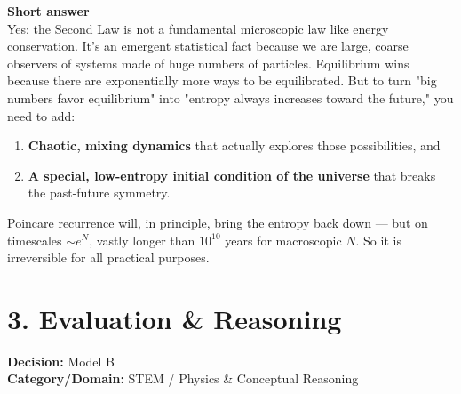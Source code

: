 \documentclass[11pt, a4paper]{article}
\begin{document}
{{        \vspace{0.2cm}
        \textbf{Short answer}\\
        Yes: the Second Law is not a fundamental microscopic law like energy conservation. It's an emergent statistical fact because we are large, coarse observers of systems made of huge numbers of particles. Equilibrium wins because there are exponentially more ways to be equilibrated. But to turn "big numbers favor equilibrium" into "entropy always increases toward the future," you need to add:
        \begin{enumerate}[leftmargin=*, topsep=0pt]
            \item \textbf{Chaotic, mixing dynamics} that actually explores those possibilities, and
            \item \textbf{A special, low-entropy initial condition of the universe} that breaks the past-future symmetry.
        \end{enumerate}
        Poincare recurrence will, in principle, bring the entropy back down --- but on timescales $\sim e^N$, vastly longer than $10^{10}$ years for macroscopic $N$. So it is irreversible for all practical purposes.
    }%
}

\vspace{0.5cm}

\section*{3. Evaluation \& Reasoning}

\textbf{Decision:} Model B \\
\textbf{Category/Domain:} STEM / Physics \& Conceptual Reasoning
\end{document}
